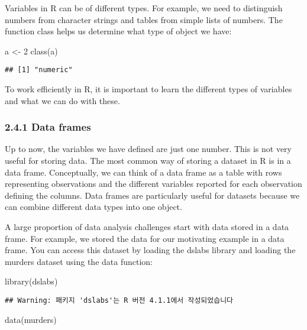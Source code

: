 \documentclass[
]{article}
\newenvironment{Shaded}{\begin{snugshade}}{\end{snugshade}}
\newcommand{\DecValTok}[1]{\textcolor[rgb]{0.00,0.00,0.81}{#1}}
\newcommand{\FunctionTok}[1]{\textcolor[rgb]{0.00,0.00,0.00}{#1}}
\newcommand{\NormalTok}[1]{#1}
\newcommand{\OtherTok}[1]{\textcolor[rgb]{0.56,0.35,0.01}{#1}}
\begin{document}
Variables in R can be of different types. For example, we need to
distinguish numbers from character strings and tables from simple lists
of numbers. The function class helps us determine what type of object we
have:

\begin{Shaded}
\begin{Highlighting}[]
\NormalTok{a }\OtherTok{\textless{}{-}} \DecValTok{2}
\FunctionTok{class}\NormalTok{(a)}
\end{Highlighting}
\end{Shaded}

\begin{verbatim}
## [1] "numeric"
\end{verbatim}

To work efficiently in R, it is important to learn the different types
of variables and what we can do with these.

\hypertarget{data-frames}{%
\subsubsection{2.4.1 Data frames}\label{data-frames}}

Up to now, the variables we have defined are just one number. This is
not very useful for storing data. The most common way of storing a
dataset in R is in a data frame. Conceptually, we can think of a data
frame as a table with rows representing observations and the different
variables reported for each observation defining the columns. Data
frames are particularly useful for datasets because we can combine
different data types into one object.

A large proportion of data analysis challenges start with data stored in
a data frame. For example, we stored the data for our motivating example
in a data frame. You can access this dataset by loading the dslabs
library and loading the murders dataset using the data function:

\begin{Shaded}
\begin{Highlighting}[]
\FunctionTok{library}\NormalTok{(dslabs)}
\end{Highlighting}
\end{Shaded}

\begin{verbatim}
## Warning: 패키지 'dslabs'는 R 버전 4.1.1에서 작성되었습니다
\end{verbatim}

\begin{Shaded}
\begin{Highlighting}[]
\FunctionTok{data}\NormalTok{(murders)}
\end{Highlighting}
\end{Shaded}
\end{document}
